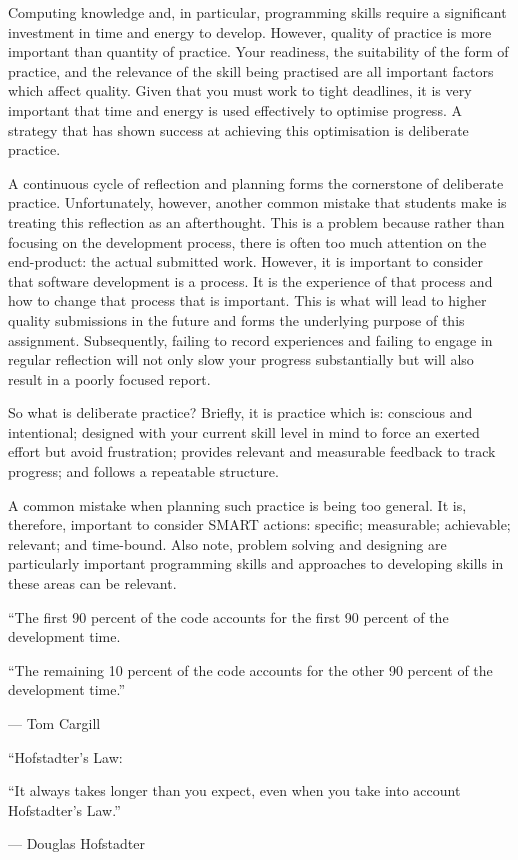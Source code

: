 \documentclass{../fal_assignment}
\begin{document}
Computing knowledge and, in particular, programming skills require a significant investment in time and energy to develop. However, quality of practice is more important than quantity of practice. Your readiness, the suitability of the form of practice, and the relevance of the skill being practised are all important factors which affect quality. Given that you must work to tight deadlines, it is very important that time and energy is used effectively to optimise progress. A strategy that has shown success at achieving this optimisation is deliberate practice.

A continuous cycle of reflection and planning forms the cornerstone of deliberate practice. Unfortunately, however, another common mistake that students make is treating this reflection as an afterthought. This is a problem because rather than focusing on the development process, there is often too much attention on the end-product: the actual submitted work. However, it is important to consider that software development is a process. It is the experience of that process and how to change that process that is important. This is what will lead to higher quality submissions in the future and forms the underlying purpose of this assignment. Subsequently, failing to record experiences and failing to engage in regular reflection will not only slow your progress substantially but will also result in a poorly focused report.

So what is deliberate practice? Briefly, it is practice which is: conscious and intentional; designed with your current skill level in mind to force an exerted effort but avoid frustration; provides relevant and measurable feedback to track progress; and follows a repeatable structure.

A common mistake when planning such practice is being too general. It is, therefore, important to consider SMART actions: specific; measurable; achievable; relevant; and time-bound. Also note, problem solving and designing are particularly important programming skills and approaches to developing skills in these areas can be relevant.

\begin{marginquote}
    ``The first 90 percent of the code accounts for the first 90 percent of the development time.
    
    ``The remaining 10 percent of the code accounts for the other 90 percent of the development time.''
    
    --- Tom Cargill
    
    \marginquoterule
    
    ``Hofstadter's Law:
    
    ``It always takes longer than you expect, even when you take into account Hofstadter's Law.''
    
    --- Douglas Hofstadter
\end{marginquote}
\end{document}
